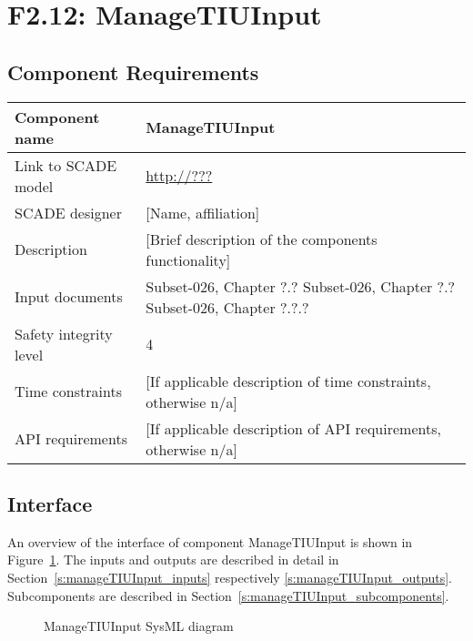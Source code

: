 
\section{F2.12: ManageTIUInput}

\subsection{Component Requirements}

\begin{longtable}{p{}p{}}
\toprule
Component name			& ManageTIUInput \\
\midrule
Link to SCADE model		& {\footnotesize \url{http://???}} \\
\midrule
SCADE designer			& [Name, affiliation] \\
\midrule
Description				& [Brief description of the components functionality] \\
\midrule
Input documents	& 
Subset-026, Chapter ?.?\newline
Subset-026, Chapter ?.?\newline
Subset-026, Chapter ?.?.?\\
\midrule
Safety integrity level		& 4 \\
\midrule
Time constraints		& [If applicable description of time constraints, otherwise n/a] \\
\midrule
API requirements 		& [If applicable description of API requirements, otherwise n/a] \\
\bottomrule
\end{longtable}


\subsection{Interface}

An overview of the interface of component ManageTIUInput is shown in Figure~\ref{f:manageTIUInput}. The inputs and outputs are described in detail in Section~\ref{s:manageTIUInput_inputs} respectively \ref{s:manageTIUInput_outputs}. Subcomponents are described in Section~\ref{s:manageTIUInput_subcomponents}.

\begin{figure}
\center
{}
\caption{ManageTIUInput SysML diagram}\label{f:manageTIUInput}
\end{figure}



